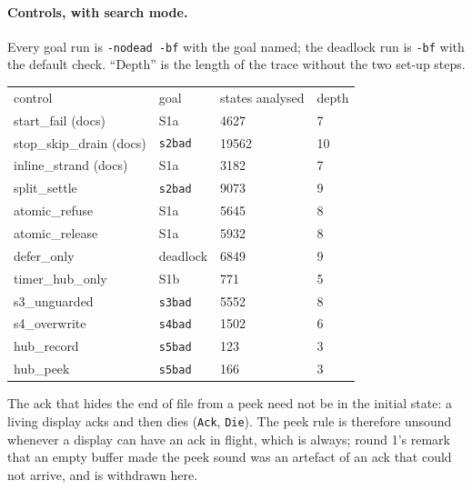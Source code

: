 \documentclass[a4paper,10pt,fleqn]{article}
\begin{document}
\paragraph{Controls, with search mode.}
Every goal run is \texttt{-nodead -bf} with the goal named; the deadlock run is
\texttt{-bf} with the default check.  ``Depth'' is the length of the trace
without the two set-up steps.
\begin{center}
\begin{tabular}{llll}
control & goal & states analysed & depth \\
start\_fail (docs) & S1a & 4627 & 7 \\
stop\_skip\_drain (docs) & \texttt{s2bad} & 19562 & 10 \\
inline\_strand (docs) & S1a & 3182 & 7 \\
split\_settle & \texttt{s2bad} & 9073 & 9 \\
atomic\_refuse & S1a & 5645 & 8 \\
atomic\_release & S1a & 5932 & 8 \\
defer\_only & deadlock & 6849 & 9 \\
timer\_hub\_only & S1b & 771 & 5 \\
s3\_unguarded & \texttt{s3bad} & 5552 & 8 \\
s4\_overwrite & \texttt{s4bad} & 1502 & 6 \\
hub\_record & \texttt{s5bad} & 123 & 3 \\
hub\_peek & \texttt{s5bad} & 166 & 3 \\
\end{tabular}
\end{center}
The ack that hides the end of file from a peek need not be in the initial
state: a living display acks and then dies (\texttt{Ack}, \texttt{Die}).  The
peek rule is therefore unsound whenever a display can have an ack in flight,
which is always; round 1's remark that an empty buffer made the peek sound was an
artefact of an ack that could not arrive, and is withdrawn here.
\end{document}
